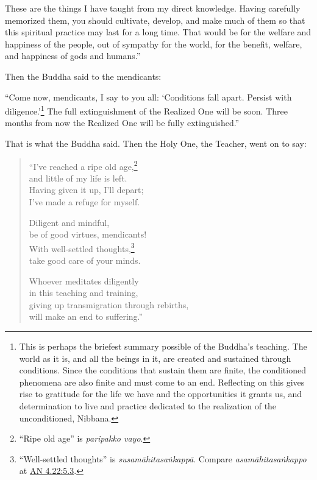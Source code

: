 \documentclass[12pt,openany]{book}%
\begin{document}
These are the things I have taught from my direct knowledge. Having carefully memorized them, you should cultivate, develop, and make much of them so that this spiritual practice may last for a long time. That would be for the welfare and happiness of the people, out of sympathy for the world, for the benefit, welfare, and happiness of gods and humans.” 

Then the Buddha said to the mendicants: 

“Come now, mendicants, I say to you all: ‘Conditions fall apart. Persist with diligence.’\footnote{This is perhaps the briefest summary possible of the Buddha’s teaching. The world as it is, and all the beings in it, are created and sustained through conditions. Since the conditions that sustain them are finite, the conditioned phenomena are also finite and must come to an end. Reflecting on this gives rise to gratitude for the life we have and the opportunities it grants us, and determination to live and practice dedicated to the realization of the unconditioned, Nibbana. } The full extinguishment of the Realized One will be soon. Three months from now the Realized One will be fully extinguished.” 

That is what the Buddha said. Then the Holy One, the Teacher, went on to say: 

\begin{verse}%
“I’ve reached a ripe old age,\footnote{“Ripe old age” is \textit{paripakko vayo}. } \\
and little of my life is left. \\
Having given it up, I’ll depart; \\
I’ve made a refuge for myself. 

Diligent and mindful, \\
be of good virtues, mendicants! \\
With well-settled thoughts,\footnote{“Well-settled thoughts” is \textit{\textsanskrit{susamāhitasaṅkappā}}. Compare \textit{\textsanskrit{asamāhitasaṅkappo}} at \href{https://suttacentral.net/an4.22/en/sujato\#5.3}{AN 4.22:5.3}. } \\
take good care of your minds. 

Whoever meditates diligently \\
in this teaching and training, \\
giving up transmigration through rebirths, \\
will make an end to suffering.” 

%
\end{verse}
\end{document}
